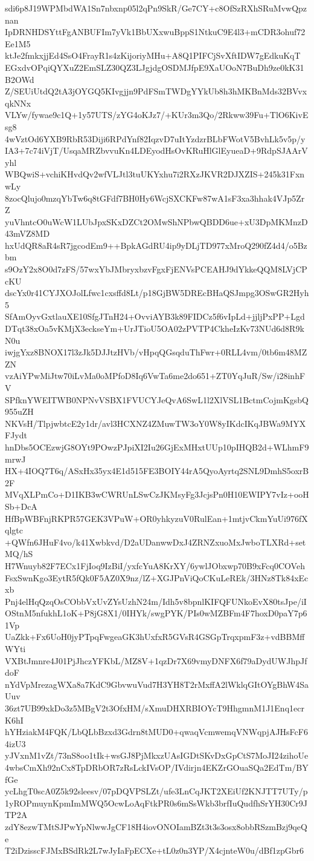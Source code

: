 sdi6p8J19WPMbdWA1Sn7nbxnp05l2qPn9SkR/Ge7CY+c8OfSzRXhSRuMvwQpznan
IpDRNHDSYttFgANBUFIm7yVk1BbUXxwuBppS1NtkuC9E4l3+mCDR3ohuf72Ee1M5
ktJe2fmkxjjEd4SsO4FrayR1s4zKijoriyMHu+A8Q1PIFCjSvXftIDW7gEdkuKqT
EGxdvOPqiQYXuZ2EmSLZ30QZ3LJgjdgOSDMJfpE9XaUOoN7BuDh9ze0kK31B2OWd
Z/SEUiUtdQ2tA3jOYGQ5KIvgjjn9PdFSmTWDgYYkUb8h3hMKBnMds32BVvxqkNNx
VLYw/fywae9c1Q+1y57UTS/zYG4oKJz7/+KUr3m3Qo/2Rkww39Fu+TlO6KivEsg8
4wVztOd6YXB9RbR53Diji6RPdYnf82IqzvD7uItYzdzrBLbFWotV5BvhLk5v5p/y
IA3+7c74iVjT/UsqaMRZbvvuKn4LDEyodHsOvKRuHlGlEyueaD+9RdpSJAArVyhl
WBQwiS+vchiKHvdQv2wfVLJtl3tuUKYxhu7i2RXzJKVR2DJXZIS+245k31FxnwLy
8zocQlujo0mzqYbTw6q8tGFdf7BH0Hy6WcjSXCKFw87wA1sF3xa3hhak4VJp5ZrZ
yuVhntcO0uWcW1LUbJpxSKxDZCt2OMwShNPbwQBDD6ue+xU3DpMKMnzD43mVZ8MD
hxUdQR8aR4sR7jgcodEm9++BpkAGdRU4ip9yDLjTD977xMroQ290fZ4d4/o5Bzbm
s9OzY2x8O0d7zFS/57wxYbJMbryxbzvFgxFjENVsPCEAHJ9dYkkeQQM8LVjCPcKU
dscYx0r41CYJXOJolLfwc1cxsffd8Lt/p18GjBW5DREcBHaQSJmpg3OSwGR2Hyh5
SfAmOyvGxtlauXE10SfgJTnH24+OvviAYB3k89FIDCz5f6vIpLd+jjljPxPP+Lgd
DTqt38xOa5vKMjX3eckseYm+UrJTioU5OA02zPVTP4CkheIzKv73NUd6d8R9kN0u
iwjgYxz8BNOX17l3zJk5DJJtzHVb/vHpqQGsqduThFwr+0RLL4vm/0tb6m48MZZN
vzAiYPwMiJtw70iLvMa0oMPfoD8Iq6VwTa6me2do651+ZT0YqJuR/Sw/i28inhFV
SPfknYWEITWB0NPNvVSBX1FVUCYJeQvA6SwL1l2XlVSL1BctmCojmKgsbQ955uZH
NKVsH/TlpjwbtcE2y1dr/avl3HCXNZ4ZMuwTW3oY0W8yIKdcIKqJBWa9MYXFJydt
hnDbs5OCEzwjG8OYt9POwzPJpiXI2Iu26GjExMHxtUUp10pIHQB2d+WLhmF9mrwJ
HX+4IOQ7T6q/ASxHx35yx4E1d515FE3BOIY44rA5QyoAyrtq2SNL9DmhS5oxrB2F
MVqXLPmCo+D1IKB3wCWRUnLSwCzJKMsyFg3JcjsPn0H10EWIPY7vIz+ooHSb+DcA
HfBpWBFnjRKPR57GEK3VPuW+OR0yhkyzuV0RulEan+1mtjvCkmYuUi976fXqlgtc
+QWfn6JHuF4vo/k41Xwbkvd/D2aUDanwwDxJ4ZRNZxuoMxJwboTLXRd+setMQ/hS
H7Wnuyb82F7ECx1FjIoq9IzBiI/yxfcYuA8KrXY/6ywlJObxwp70B9xFcq0COVeh
FsxSwnKgo3EytR5fQk0F5AZ0X9nz/lZ+XGJPnViQoCKuLeREk/3HNz8Tk84xEcxb
Pnj4elHqQzqOsCObbVxUvZYsUzhN24m/Idh5v8bpnlKIFQFUNkoEvX80tsJpe/iI
OStnM5nfukhL1oK+P8jG8X1/0IHYk/swgPYK/PIs0wMZBFm4F7hoxD0paY7p61Vp
UaZkk+Fx6UoH0jyPTpqFwgeaGK3hUxfxR5GVsR4GSGpTrqxpmF3z+vdBBMffWYti
VXBtJmnre4J01PjJhczYFKbL/MZ8V+1qzDr7X69vmyDNFX6f79aDydUWJhpJfdoF
nYdVpMrezagWXa8a7KdC9GbvwuVud7H3YH8T2rMxffA2lWklqGItOYgBhW4SaUuv
36zt7UB99xkDo3z5MBgV2t3OfxHM/sXmuDHXRBIOYcT9HhgmnM1J1Enq1ecrK6hI
hYHziakM4FQK/LbQLbBzxd3Gdrn8tMUD0+qwaqVcmwemqVNWqpjAJHsFcF64izU3
yJVxnM1vZt/73nS8oo1tIk+wsGJ8PjMkxzUAsIGDtSKvDxGpCtS7MoJI24zihoUe
4wbsCmXh92nCx8TpDRbOR7zRsLckIVsOP/IVdirjn4EKZrGOuaSQa2EdTm/BYfGe
ycLhgT0scA0Z5k92sleesv/07pDQVPSLZt/ufe3LnCqJKT2XEiUf2KNJTT7UTy/p
1yROPmuynKpmImMWQ5OcwLoAqFtkPR0s6mSsWkb3brfIuQudfhSrYH30Cr9JTP2A
zdY8ezwTMtSJPwYpNlwwJgCF18H4iovONOIamBZt3t3s3osx8obbRSzmBzj9qeQe
T2iDzisscFJMxBSdRk2L7wJyIaFpECXe+tL0z0n3YP/X4cjnteW0u/dBf1zpGbr6
